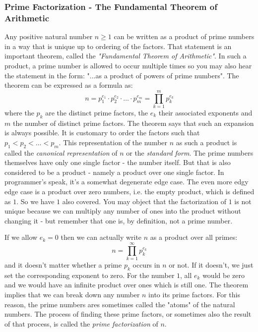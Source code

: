 \subsubsection{Prime Factorization - The Fundamental Theorem of Arithmetic}
Any positive natural number $n \geq 1$ can be written as a product of prime numbers in a way that is unique up to ordering of the factors. That statement is an important theorem, called the \emph{"Fundamental Theorem of Arithmetic"}. In such a product, a prime number is allowed to occur multiple times so you may also hear the statement in the form: "...as a product of powers of prime numbers". The theorem can be expressed as a formula as:
\begin{equation}
 n = p_1^{e_1} \cdot p_2^{e_2} \cdot \ldots \cdot p_m^{e_m}
   = \prod_{k=1}^{m} p_k^{e_k}
\end{equation}
where the $p_k$ are the distinct prime factors, the $e_k$ their associated exponents and $m$ the number of distinct prime factors. The theorem says that such an expansion is always possible. It is customary to order the factors such that $p_1 < p_2 < \ldots < p_m$. This representation of the number $n$ as such a product is called the \emph{canonical representation} of $n$ or the \emph{standard form}. The prime numbers themselves have only one single factor - the number itself. But that is also considered to be a product - namely a product over one single factor. In programmer's speak, it's a somewhat degenerate edge case. The even more edgy edge case is a product over zero numbers, i.e. the empty product, which is defined as $1$. So we have $1$ also covered. You may object that the factorization of $1$ is not unique because we can multiply any number of ones into the product without changing it - but remember that one is, by definition, not a prime number. 


\medskip
If we allow $e_k = 0$ then we can actually write $n$ as a product over all primes:
\begin{equation}
 n = \prod_{k=1}^{\infty} p_k^{e_k}
\end{equation}
and it doesn't matter whether a prime $p_k$ occurs in $n$ or not. If it doesn't, we just set the corresponding exponent to zero. For the number $1$, all $e_k$ would be zero and we would have an infinite product over ones which is still one. The theorem implies that we can break down any number $n$ into its prime factors. For this reason, the prime numbers ares sometimes called the "atoms" of the natural numbers. The process of finding these prime factors, or sometimes also the result of that process, is called the \emph{prime factorization} of $n$.

